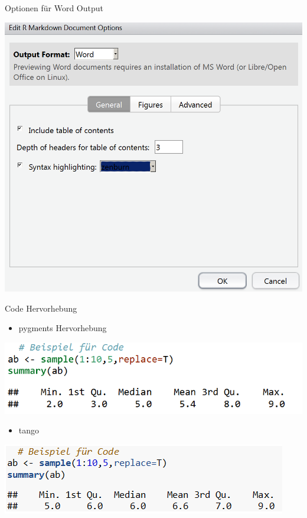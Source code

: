 \documentclass[ignorenonframetext,]{beamer}
\providecommand{\tightlist}{%
\setlength{\itemsep}{0pt}\setlength{\parskip}{0pt}}
\begin{document}
\begin{frame}{Optionen für Word Output}

\includegraphics{./tex2pdf.956/72a16d74da4290258d030c58c103f0f7a00fa061.png}

\end{frame}

\begin{frame}{Code Hervorhebung}

\begin{itemize}
\tightlist
\item
  pygments Hervorhebung
\end{itemize}

\includegraphics{./tex2pdf.956/341b9304cd9e3c59671fa5aee5f31f34da0c70ab.png}

\begin{itemize}
\tightlist
\item
  tango
\end{itemize}

\includegraphics{./tex2pdf.956/f668e6672d8e4bcb15dee6d48d3d8e859a0bb2f1.png}

\end{frame}
\end{document}
